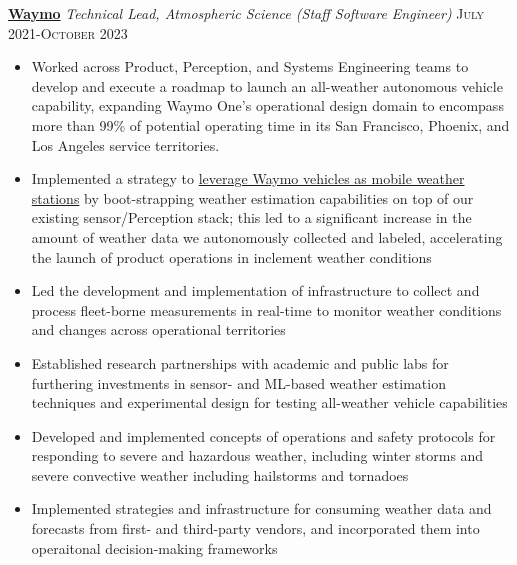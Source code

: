 \documentclass[11pt,letterpaper]{article}
\newcommand{\rdate}[1]{{\addfontfeature{Numbers=OldStyle} \hfill #1}}
\begin{document}
\medskip
\textbf{\href{http://www.waymo.com}{Waymo}} \newline
\emph{Technical Lead, Atmospheric Science (Staff Software Engineer)} \rdate{\textsc{July} 2021-\textsc{October} 2023}
\begin{itemize}[itemindent=-10pt]
	\item Worked across Product, Perception, and Systems Engineering teams to develop and execute a roadmap to launch an all-weather autonomous vehicle capability, expanding Waymo One's operational design domain to encompass more than 99\% of potential operating time in its San Francisco, Phoenix, and Los Angeles service territories.
	\item Implemented a strategy to \href{https://waymo.com/blog/2022/11/using-cutting-edge-weather-research-to-advance-the-Waymo-Driver.html}{leverage Waymo vehicles as mobile weather stations} by boot-strapping weather estimation capabilities on top of our existing sensor/Perception stack; this led to a significant increase in the amount of weather data we autonomously collected and labeled, accelerating the launch of product operations in inclement weather conditions
	\item Led the development and implementation of infrastructure to collect and process fleet-borne measurements in real-time to monitor weather conditions and changes across operational territories
	\item Established research partnerships with academic and public labs for furthering investments in sensor- and ML-based weather estimation techniques and experimental design for testing all-weather vehicle capabilities
	\item Developed and implemented concepts of operations and safety protocols for responding to severe and hazardous weather, including winter storms and severe convective weather including hailstorms and tornadoes
	\item Implemented strategies and infrastructure for consuming weather data and forecasts from first- and third-party vendors, and incorporated them into operaitonal decision-making frameworks
\end{itemize}
\end{document}
